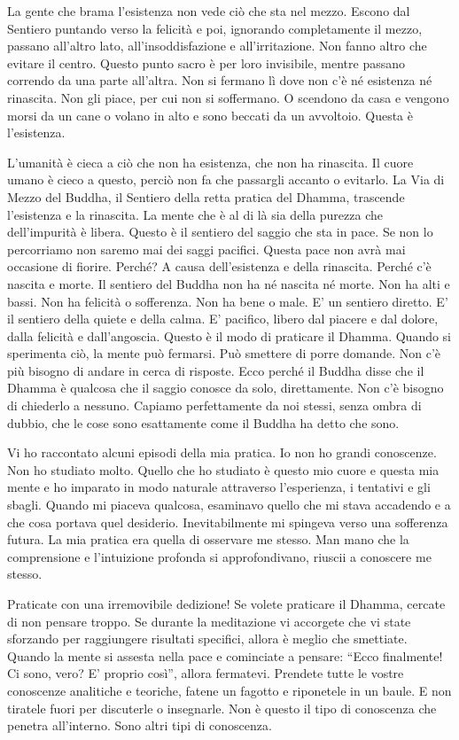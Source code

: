 La gente che brama l'esistenza non vede ciò che sta nel mezzo. Escono
dal Sentiero puntando verso la felicità e poi, ignorando completamente
il mezzo, passano all'altro lato, all'insoddisfazione e all'irritazione.
Non fanno altro che evitare il centro. Questo punto sacro è per loro
invisibile, mentre passano correndo da una parte all'altra. Non si
fermano lì dove non c'è né esistenza né rinascita. Non gli piace, per
cui non si soffermano. O scendono da casa e vengono morsi da un cane o
volano in alto e sono beccati da un avvoltoio. Questa è l'esistenza.

L'umanità è cieca a ciò che non ha esistenza, che non ha rinascita. Il
cuore umano è cieco a questo, perciò non fa che passargli accanto o
evitarlo. La Via di Mezzo del Buddha, il Sentiero della retta pratica
del Dhamma, trascende l'esistenza e la rinascita. La mente che è al di
là sia della purezza che dell'impurità è libera. Questo è il sentiero
del saggio che sta in pace. Se non lo percorriamo non saremo mai dei
saggi pacifici. Questa pace non avrà mai occasione di fiorire. Perché? A
causa dell'esistenza e della rinascita. Perché c'è nascita e morte. Il
sentiero del Buddha non ha né nascita né morte. Non ha alti e bassi. Non
ha felicità o sofferenza. Non ha bene o male. E' un sentiero diretto. E'
il sentiero della quiete e della calma. E' pacifico, libero dal piacere
e dal dolore, dalla felicità e dall'angoscia. Questo è il modo di
praticare il Dhamma. Quando si sperimenta ciò, la mente può fermarsi.
Può smettere di porre domande. Non c'è più bisogno di andare in cerca di
risposte. Ecco perché il Buddha disse che il Dhamma è qualcosa che il
saggio conosce da solo, direttamente. Non c'è bisogno di chiederlo a
nessuno. Capiamo perfettamente da noi stessi, senza ombra di dubbio, che
le cose sono esattamente come il Buddha ha detto che sono.


Vi ho raccontato alcuni episodi della mia pratica. Io non ho grandi
conoscenze. Non ho studiato molto. Quello che ho studiato è questo mio
cuore e questa mia mente e ho imparato in modo naturale attraverso
l'esperienza, i tentativi e gli sbagli. Quando mi piaceva qualcosa,
esaminavo quello che mi stava accadendo e a che cosa portava quel
desiderio. Inevitabilmente mi spingeva verso una sofferenza futura. La
mia pratica era quella di osservare me stesso. Man mano che la
comprensione e l'intuizione profonda si approfondivano, riuscii a
conoscere me stesso.

Praticate con una irremovibile dedizione! Se volete praticare il Dhamma,
cercate di non pensare troppo. Se durante la meditazione vi accorgete
che vi state sforzando per raggiungere risultati specifici, allora è
meglio che smettiate. Quando la mente si assesta nella pace e cominciate
a pensare: ``Ecco finalmente! Ci sono, vero? E' proprio così'', allora
fermatevi. Prendete tutte le vostre conoscenze analitiche e teoriche,
fatene un fagotto e riponetele in un baule. E non tiratele fuori per
discuterle o insegnarle. Non è questo il tipo di conoscenza che penetra
all'interno. Sono altri tipi di conoscenza.

